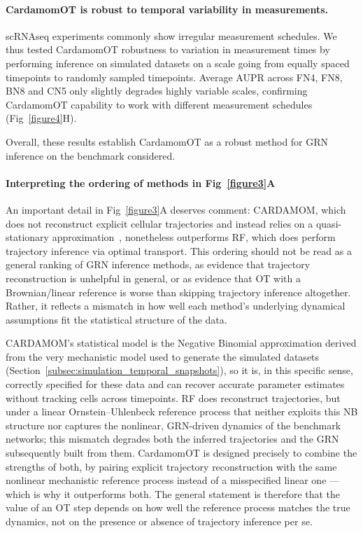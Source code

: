 \documentclass[a4paper, 11pt]{article}
\theoremstyle{plain}
\theoremstyle{remark}
\newcommand*{\firstreview}[1]{{\color{black}#1}}
\begin{document}
\firstreview{
\paragraph{CardamomOT is robust to temporal variability in measurements.}
scRNAseq experiments commonly show irregular measurement schedules. We thus tested CardamomOT robustness to variation in measurement times by performing inference on simulated datasets on a scale going from equally spaced timepoints to randomly sampled timepoints. Average AUPR across FN4, FN8, BN8 and CN5 only slightly degrades highly variable scales, confirming CardamomOT capability to work with different measurement schedules (Fig~\ref{figure4}H). 
}

Overall, \firstreview{these results establish CardamomOT as a robust method for GRN inference on the benchmark considered.}

\firstreview{\paragraph{Interpreting the ordering of methods in Fig~\ref{figure3}A}
An important detail in Fig~\ref{figure3}A deserves comment: CARDAMOM, which does not
reconstruct explicit cellular trajectories and instead relies on a quasi-stationary
approximation~\cite{ventre2023one}, nonetheless outperforms RF, which does perform trajectory
inference via optimal transport. This ordering should not be read as a general ranking of GRN
inference methods, as evidence that trajectory reconstruction is unhelpful in general, or as
evidence that OT with a Brownian/linear reference is worse than skipping trajectory inference
altogether. Rather, it reflects a mismatch in how well each method's underlying dynamical
assumptions fit the statistical structure of the data.}

\firstreview{CARDAMOM's statistical model is the Negative Binomial approximation derived from the}
very mechanistic model used to generate the simulated datasets
(Section~\ref{subsec:simulation_temporal_snapshots}), so it is, in this specific sense, correctly
specified for these data and can recover accurate parameter estimates without tracking cells
across timepoints. RF does reconstruct trajectories, but under a linear Ornstein--Uhlenbeck
reference process that neither exploits this NB structure nor captures the nonlinear, GRN-driven
dynamics of the benchmark networks; this mismatch degrades both the inferred trajectories and the
GRN subsequently built from them. CardamomOT is designed precisely to combine the strengths of
both, by pairing explicit trajectory reconstruction with the same nonlinear mechanistic reference
process instead of a misspecified linear one --- which is why it outperforms both. The general
statement is therefore that the value of an OT step depends on how well the reference process
matches the true dynamics, not on the presence or absence of trajectory inference per se.
\end{document}
